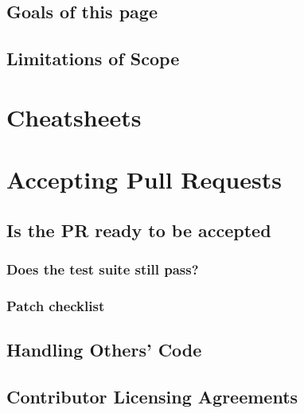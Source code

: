 \documentclass[]{book}
\begin{document}
\hypertarget{goals-of-this-page}{%
\section{Goals of this page}\label{goals-of-this-page}}

\hypertarget{limitations-of-scope}{%
\section{Limitations of Scope}\label{limitations-of-scope}}

\hypertarget{cheatsheets}{%
\chapter{Cheatsheets}\label{cheatsheets}}

\hypertarget{accepting-pull-requests-1}{%
\chapter{Accepting Pull Requests}\label{accepting-pull-requests-1}}

\hypertarget{is-the-pr-ready-to-be-accepted-1}{%
\section{Is the PR ready to be accepted}\label{is-the-pr-ready-to-be-accepted-1}}

\hypertarget{does-the-test-suite-still-pass-1}{%
\subsection{Does the test suite still pass?}\label{does-the-test-suite-still-pass-1}}

\hypertarget{patch-checklist-1}{%
\subsection{Patch checklist}\label{patch-checklist-1}}

\hypertarget{handling-others-code-1}{%
\section{Handling Others' Code}\label{handling-others-code-1}}

\hypertarget{contributor-licensing-agreements-1}{%
\section{Contributor Licensing Agreements}\label{contributor-licensing-agreements-1}}
\end{document}
